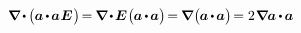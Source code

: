 \begin{equation*}
\boldnabla \hspace{-0.16ex} \dotp \hspace{-0.12ex} \bigl( \hspace{-0.05ex} \bm{a} \hspace{-0.17ex} \dotp \hspace{-0.2ex} \bm{a} \hspace{.1ex} \UnitDyad \hspace{.12ex} \bigr) \hspace{-0.33ex}
= \hspace{-0.15ex} \boldnabla \hspace{-0.2ex} \dotp \hspace{-0.22ex}  \UnitDyad \hspace{.13ex} \bigl( \hspace{-0.1ex} \bm{a} \hspace{-0.17ex} \dotp \hspace{-0.2ex} \bm{a} \bigr) \hspace{-0.33ex}
= \hspace{-0.15ex} \boldnabla \hspace{.1ex} \bigl( \hspace{-0.1ex} \bm{a} \hspace{-0.17ex} \dotp \hspace{-0.2ex} \bm{a} \bigr) \hspace{-0.33ex}
= 2 \hspace{.16ex} \boldnabla \hspace{-0.1ex} \bm{a} \hspace{-0.12ex} \dotp \hspace{-0.15ex} \bm{a}
\end{equation*}

